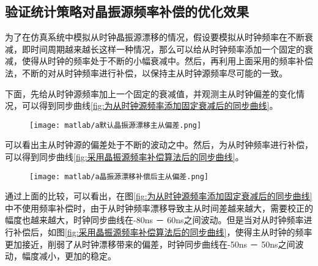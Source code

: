 \subsection{验证统计策略对晶振源频率补偿的优化效果}
为了在仿真系统中模拟从时钟晶振源漂移的情况，假设要模拟从时钟频率在不断衰减，即时间周期越来越长这样一种情况，那么可以给从时钟频率添加一个固定的衰减，使得从时钟的频率处于不断的小幅衰减中。然后，再利用上面采用的频率补偿法，不断的对从时钟频率进行补偿，以保持主从时钟源频率尽可能的一致。

下面，先给从时钟源频率加上一个固定的衰减值，并观测主从时钟偏差的变化情况，可以得到同步曲线\ref{fig:为从时钟源频率添加固定衰减后的同步曲线}。
\begin{figure}[!hbp]
  \centering
  \begin{minipage}[b]{1\textwidth}
    \captionstyle{\centering}
    \centering
    \texttt{[image: matlab/a默认晶振源漂移主从偏差.png]}
  \end{minipage}     
\end{figure}

可以看出主从时钟源的偏差处于不断的波动之中。然后，为从时钟频率进行补偿，可以得到同步曲线\ref{fig:采用晶振源频率补偿算法后的同步曲线}。
\begin{figure}[!hbp]
  \centering
  \begin{minipage}[b]{1\textwidth}
    \captionstyle{\centering}
    \centering
    \texttt{[image: matlab/a晶振源漂移补偿后主从偏差.png]}
  \end{minipage}     
\end{figure}

通过上面的比较，可以看出，在图\ref{fig:为从时钟源频率添加固定衰减后的同步曲线}中不使用频率补偿时，由于从时钟频率漂移导致主从时间差越来越大，需要校正的幅度也越来越大，时钟同步曲线在-80ns － 60ns之间波动。但是当对从时钟频率进行补偿后，如图\ref{fig:采用晶振源频率补偿算法后的同步曲线}，使得主从时钟的频率更加接近，削弱了从时钟漂移带来的偏差，时钟同步曲线在-50ns － 50ns之间波动，幅度减小，更加的稳定。

